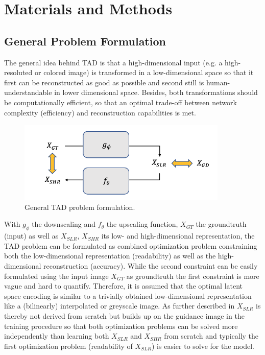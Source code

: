 \newpage
\chapter{Materials and Methods}
\label{sec:Approach}

\section{General Problem Formulation}
\label{sec:Approach_GPF}
The general idea behind \ac{TAD} is that a high-dimensional input (e.g. a
high-resoluted or colored image) is transformed in a low-dimensional space so that it first can be reconstructed as good as possible and second still is human-understandable in lower dimensional space. Besides, both transformations should be computationally efficient, so that an optimal trade-off between network complexity (efficiency) and reconstruction capabilities is met.

\begin{figure}[!htbp]
	\centering
	\includegraphics[width=10cm]{figures/problem}
	\caption{General \ac{TAD} problem formulation.}
  \label{fig:problem}
\end{figure}

With $g_\phi$ the downscaling and $f_\theta$ the upscaling function, $X_{GT}$ the groundtruth (input) as well as $X_{SLR}$, $X_{SHR}$ its low- and high-dimensional representation, the \ac{TAD} problem can be formulated as combined optimization problem constraining both the low-dimensional representation (readability) as well as the high-dimensional reconstruction (accuracy). While the second constraint can be easily formulated using the input image $X_{GT}$ as groundtruth the first constraint is more vague and hard to quantify. Therefore, it is assumed that the optimal latent space encoding is similar to a trivially obtained low-dimensional representation like a (bilinearly) interpolated or greyscale image. As further described in  $X_{SLR}$ is thereby not derived from scratch but builds up on the guidance image in the training procedure so that both optimization problems can be solved more independently than learning both $X_{SLR}$ and $X_{SHR}$ from scratch and typically the first optimization problem (readability of $X_{SLR}$) is easier to solve for the model.

